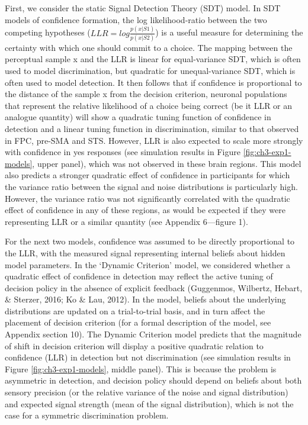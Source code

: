 \documentclass[12pt,twoside]{reedthesis}
\begin{document}
First, we consider the static Signal Detection Theory (SDT) model. In SDT models of confidence formation, the log likelihood-ratio between the two competing hypotheses (\(LLR=log\frac{p(x|S1)}{p(x|S2)}\)) is a useful measure for determining the certainty with which one should commit to a choice. The mapping between the perceptual sample x and the LLR is linear for equal-variance SDT, which is often used to model discrimination, but quadratic for unequal-variance SDT, which is often used to model detection. It then follows that if confidence is proportional to the distance of the sample x from the decision criterion, neuronal populations that represent the relative likelihood of a choice being correct (be it LLR or an analogue quantity) will show a quadratic tuning function of confidence in detection and a linear tuning function in discrimination, similar to that observed in FPC, pre-SMA and STS. However, LLR is also expected to scale more strongly with confidence in yes responses (see simulation results in Figure \ref{fig:ch3-exp1-models}, upper panel), which was not observed in these brain regions. This model also predicts a stronger quadratic effect of confidence in participants for which the variance ratio between the signal and noise distributions is particularly high. However, the variance ratio was not significantly correlated with the quadratic effect of confidence in any of these regions, as would be expected if they were representing LLR or a similar quantity (see Appendix 6---figure 1).

For the next two models, confidence was assumed to be directly proportional to the LLR, with the measured signal representing internal beliefs about hidden model parameters. In the `Dynamic Criterion' model, we considered whether a quadratic effect of confidence in detection may reflect the active tuning of decision policy in the absence of explicit feedback (Guggenmos, Wilbertz, Hebart, \& Sterzer, 2016; Ko \& Lau, 2012). In the model, beliefs about the underlying distributions are updated on a trial-to-trial basis, and in turn affect the placement of decision criterion (for a formal description of the model, see Appendix section 10). The Dynamic Criterion model predicts that the magnitude of shift in decision criterion will display a positive quadratic relation to confidence (LLR) in detection but not discrimination (see simulation results in Figure \ref{fig:ch3-exp1-models}, middle panel). This is because the problem is asymmetric in detection, and decision policy should depend on beliefs about both sensory precision (or the relative variance of the noise and signal distribution) and expected signal strength (mean of the signal distribution), which is not the case for a symmetric discrimination problem.
\end{document}
